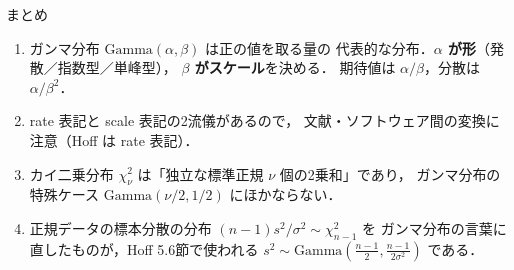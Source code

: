 \documentclass[lualatex,ja=standard,a4paper,12pt]{bxjsarticle}
\begin{document}
\begin{thmbox}{まとめ}
\begin{enumerate}
  \item ガンマ分布 $\mathrm{Gamma}(\alpha, \beta)$ は正の値を取る量の
        代表的な分布．\textbf{$\alpha$ が形}（発散／指数型／単峰型），
        \textbf{$\beta$ がスケール}を決める．
        期待値は $\alpha/\beta$，分散は $\alpha/\beta^2$．
  \item rate 表記と scale 表記の2流儀があるので，
        文献・ソフトウェア間の変換に注意（Hoff は rate 表記）．
  \item カイ二乗分布 $\chi^2_\nu$ は「独立な標準正規 $\nu$ 個の2乗和」であり，
        ガンマ分布の特殊ケース $\mathrm{Gamma}(\nu/2, 1/2)$ にほかならない．
  \item 正規データの標本分散の分布
        $(n-1)s^2/\sigma^2 \sim \chi^2_{n-1}$ を
        ガンマ分布の言葉に直したものが，Hoff 5.6節で使われる
        $s^2 \sim \mathrm{Gamma}\!\left(\frac{n-1}{2}, \frac{n-1}{2\sigma^2}\right)$ である．
\end{enumerate}
\end{thmbox}
\end{document}
